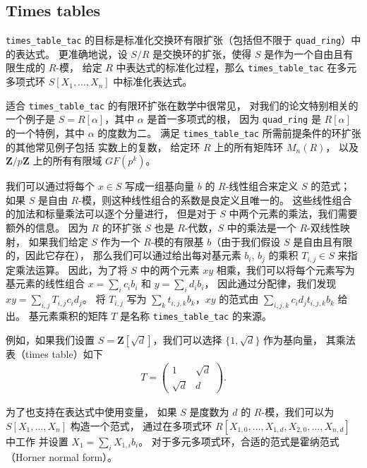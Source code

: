 \documentclass[sigplan,10pt,nonacm,
screen]{acmart} \settopmatter{printfolios=true,printccs=false,printacmref=false}
\newcommand{\ZZ}{\mathbf{Z}}
\begin{document}
\subsection{Times tables}

\lstinline{times_table_tac} 的目标是标准化交换环有限扩张（包括但不限于 \lstinline{quad_ring}）中的表达式。
更准确地说，设 $S/R$ 是交换环的扩张，使得 $S$ 是作为一个自由且有限生成的 $R$-模，
给定 $R$ 中表达式的标准化过程，那么 \lstinline{times_table_tac} 在多元多项式环 $S[X_1, \dots, X_n]$ 中标准化表达式。

适合 \lstinline{times_table_tac} 的有限环扩张在数学中很常见，
对我们的论文特别相关的一个例子是 $S = R[\alpha]$，其中 $\alpha$ 是首一多项式的根，
因为 \lstinline{quad_ring} 是 $R[\alpha]$ 的一个特例，其中 $\alpha$ 的度数为二。
满足 \lstinline{times_table_tac} 所需前提条件的环扩张的其他常见例子包括
实数上的复数，
给定环 $R$ 上的所有矩阵环 $M_{n}(R)$，
以及 $\ZZ/p\ZZ$ 上的所有有限域 $GF(p^k)$。

我们可以通过将每个 $x \in S$ 写成一组基向量 $b$ 的 $R$-线性组合来定义 $S$ 的范式；
如果 $S$ 是自由 $R$-模，则这种线性组合的系数是良定义且唯一的。
这些线性组合的加法和标量乘法可以逐个分量进行，
但是对于 $S$ 中两个元素的乘法，我们需要额外的信息。
因为 $R$ 的环扩张 $S$ 也是 $R$-代数，$S$ 中的乘法是一个 $R$-双线性映射，
如果我们给定 $S$ 作为一个 $R$-模的有限基 $b$（由于我们假设 $S$ 是自由且有限的，因此它存在），
那么我们可以通过给出每对基元素 $b_i$, $b_j$ 的乘积 $T_{i, j} \in S$ 来指定乘法运算。
因此，为了将 $S$ 中的两个元素 $x y$ 相乘，我们可以将每个元素写为基元素的线性组合 $x = \sum_i c_i b_i$ 和 $y = \sum_i d_i b_i$，
因此通过分配律，我们发现 $xy = \sum_{i, j} T_{i, j} c_i d_j$。
将 $T_{i, j}$ 写为 $\sum_k t_{i, j, k} b_k$，$xy$ 的范式由 $\sum_{i, j, k} c_i d_j t_{i, j, k} b_k$ 给出。
基元素乘积的矩阵 $T$ 是名称 \lstinline{times_table_tac} 的来源。

例如，如果我们设置 $S = \ZZ[\sqrt d]$，我们可以选择 $\{1, \sqrt d\}$ 作为基向量，
其乘法表（times table）如下
\begin{align*}
	T = \begin{pmatrix}
		1 & \sqrt d \\
		\sqrt d & d
	\end{pmatrix}.
\end{align*}

为了也支持在表达式中使用变量，
如果 $S$ 是度数为 $d$ 的 $R$-模，我们可以为 $S[X_1, \dots, X_n]$ 构造一个范式，
通过在多项式环 $R[X_{1, 0}, \dots, X_{1, d}, X_{2, 0}, \dots, X_{n, d}]$ 中工作
并设置 $X_1 = \sum_i X_{1, i} b_i$。
对于多元多项式环，合适的范式是霍纳范式（Horner normal form）。
\end{document}
